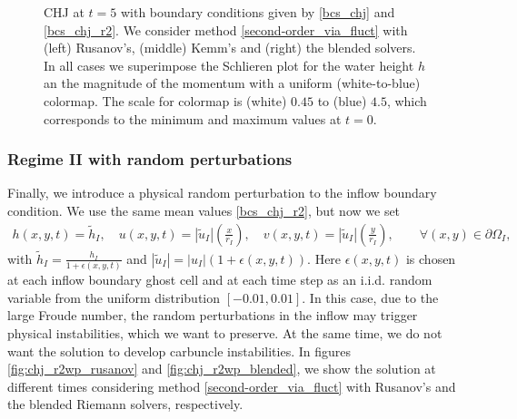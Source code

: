 \documentclass[preprint, 11pt]{article}
\newcommand{\bfu}{{u}}
\begin{document}
\begin{figure}[!h]
{  }
  \caption{CHJ at $t=5$ with boundary conditions given by \eqref{bcs_chj} and \eqref{bcs_chj_r2}. 
    We consider method \eqref{second-order_via_fluct} with (left) Rusanov's,
    (middle) Kemm's and (right) the blended solvers. 
    In all cases we superimpose the Schlieren plot for the water height $h$
    an the magnitude of the momentum with a uniform (white-to-blue) colormap. 
    The scale for colormap is (white) $0.45$ to (blue) $4.5$, 
    which corresponds to the minimum and maximum values at $t=0$.
    \label{fig:chj_r2_later}}
\end{figure}

\subsubsection{Regime II with random perturbations}
Finally, we introduce a physical random perturbation to the inflow boundary condition.
We use the same mean values \eqref{bcs_chj_r2}, but now we set
\begin{subequations}
  \begin{align}
    h(x,y,t)=\tilde h_I, \quad
    u(x,y,t)=|\tilde \bfu_I| \left(\frac{x}{r_I}\right), \quad
    v(x,y,t)=|\tilde \bfu_I| \left(\frac{y}{r_I}\right), \qquad \forall (x,y)\in\partial\Omega_I,
  \end{align}
\end{subequations}
with $\tilde h_I = \frac{h_I}{1+\epsilon(x,y,t)}$ and $|\tilde\bfu_I|=|\bfu_I|(1+\epsilon(x,y,t))$.
Here $\epsilon(x,y,t)$ is chosen at each inflow boundary ghost cell and at each
time step as an i.i.d. random variable from the uniform distribution $[-0.01,0.01]$.
In this case, due to the large Froude number, the random perturbations in the inflow
may trigger physical instabilities, which we want to preserve. At the same time, we
do not want the solution to develop carbuncle instabilities.
In figures \ref{fig:chj_r2wp_rusanov} and \ref{fig:chj_r2wp_blended}, we show the solution
at different times considering method \eqref{second-order_via_fluct} with Rusanov's and
the blended Riemann solvers, respectively. 
\end{document}
